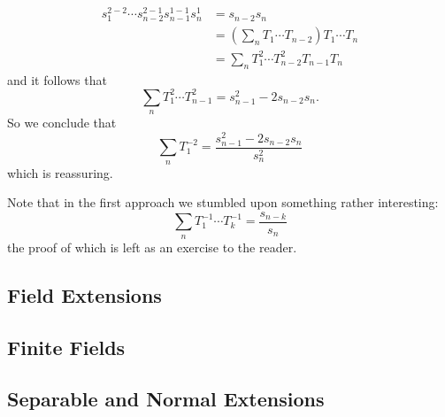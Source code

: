 \begin{sol}
\begin{enumerate}
            \begin{align*}
                s_1^{2-2}\cdots s_{n-2}^{2-1}s_{n-1}^{1-1}s_n^1&=s_{n-2}s_n\\
                &=\left(\sum_n T_1\cdots T_{n-2}\right)T_1\cdots T_n\\
                &=\sum_n T_1^2\cdots T_{n-2}^2 T_{n-1}T_n
            \end{align*}
            and it follows that
            $$\sum_n T_1^2\cdots T_{n-1}^2 = s_{n-1}^2-2s_{n-2}s_n.$$
            So we conclude that
            $$ \sum_n T_1^{-2} = \frac{s_{n-1}^2-2s_{n-2}s_n}{s_n^2}$$
            which is reassuring.
        \end{enumerate}
        Note that in the first approach we stumbled upon something rather interesting:
        $$
            \sum_n T_1^{-1}\cdots T_k^{-1} = \frac{s_{n-k}}{s_n}
        $$
        the proof of which is left as an exercise to the reader.
    \end{sol}

\subsection{Field Extensions}

\subsection{Finite Fields}

\subsection{Separable and Normal Extensions}